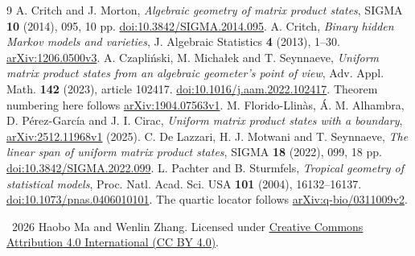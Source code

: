 \documentclass[11pt]{article}
\begin{document}
\begin{thebibliography}{9}
 A. Critch and J. Morton,
\emph{Algebraic geometry of matrix product states},
SIGMA \textbf{10} (2014), 095, 10 pp.
\href{https://doi.org/10.3842/SIGMA.2014.095}{doi:10.3842/SIGMA.2014.095}.
 A. Critch,
\emph{Binary hidden Markov models and varieties},
J. Algebraic Statistics \textbf{4} (2013), 1--30.
\href{https://arxiv.org/abs/1206.0500v3}{arXiv:1206.0500v3}.
 A. Czapli\'nski, M. Micha\l{}ek and T. Seynnaeve,
\emph{Uniform matrix product states from an algebraic geometer's point of view},
Adv. Appl. Math. \textbf{142} (2023), article 102417.
\href{https://doi.org/10.1016/j.aam.2022.102417}{doi:10.1016/j.aam.2022.102417}.
Theorem numbering here follows \href{https://arxiv.org/abs/1904.07563v1}{arXiv:1904.07563v1}.
 M. Florido-Llin\`as, \'A. M. Alhambra,
D. P\'erez-Garc\'ia and J. I. Cirac,
\emph{Uniform matrix product states with a boundary},
\href{https://arxiv.org/abs/2512.11968v1}{arXiv:2512.11968v1} (2025).
 C. De Lazzari, H. J. Motwani and T. Seynnaeve,
\emph{The linear span of uniform matrix product states},
SIGMA \textbf{18} (2022), 099, 18 pp.
\href{https://doi.org/10.3842/SIGMA.2022.099}{doi:10.3842/SIGMA.2022.099}.
 L. Pachter and B. Sturmfels,
\emph{Tropical geometry of statistical models},
Proc. Natl. Acad. Sci. USA \textbf{101} (2004), 16132--16137.
\href{https://doi.org/10.1073/pnas.0406010101}{doi:10.1073/pnas.0406010101}.
The quartic locator follows \href{https://arxiv.org/abs/q-bio/0311009v2}{arXiv:q-bio/0311009v2}.
\end{thebibliography}
\medskip
\noindent\small\textcopyright\ 2026 Haobo Ma and Wenlin Zhang.
Licensed under \href{https://creativecommons.org/licenses/by/4.0/}{Creative Commons Attribution 4.0 International (CC BY 4.0)}.
\end{document}
